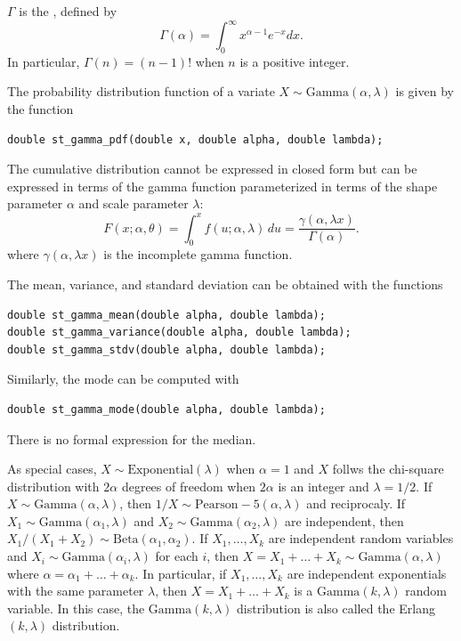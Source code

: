 $\Gamma$ is the , defined by
\[
\Gamma (\alpha) = \int_0^\infty x^{\alpha-1} e^{-x} dx.
\]
In particular, $\Gamma(n) = (n-1)!$ when $n$ is a positive integer.

The probability distribution function of a variate $X \sim
\mbox{Gamma}(\alpha, \lambda)$ is given by the function
\begin{verbatim}
double st_gamma_pdf(double x, double alpha, double lambda);
\end{verbatim}
The cumulative distribution cannot be expressed in closed form but can
be expressed in terms of the gamma function parameterized in terms of
the shape parameter $\alpha$ and scale parameter $\lambda$:
\[
F(x;\alpha,\theta) = \int_0^x f(u;\alpha,\lambda)\,du =\frac{\gamma(\alpha,
  \lambda x)}{\Gamma(\alpha)}. 
\]
where $\gamma(\alpha, \lambda x)$ is the incomplete gamma
function.

The mean, variance, and standard deviation can be obtained with the
functions
\begin{verbatim}
double st_gamma_mean(double alpha, double lambda);
double st_gamma_variance(double alpha, double lambda);
double st_gamma_stdv(double alpha, double lambda);
\end{verbatim}
Similarly, the mode can be computed with
\begin{verbatim}
double st_gamma_mode(double alpha, double lambda);
\end{verbatim}
There is no formal expression for the median.

As special cases, $X \sim
\mbox{Exponential}(\lambda)$ when $\alpha =
1$ and $X$ follws the chi-square distribution with $2\alpha$ degrees
of freedom when $2\alpha$ is an integer and $\lambda = 1/2$.
If $X \sim \mbox{Gamma}(\alpha, \lambda)$, then $1/X \sim
\mbox{Pearson}-5(\alpha, \lambda)$ and reciprocaly.
If $X_1 \sim \mbox{Gamma}(\alpha_1, \lambda)$ and $X_2 \sim
\mbox{Gamma}(\alpha_2, \lambda)$ are independent, then $X_1/(X_1 +
X_2) \sim \mbox{Beta}(\alpha_1, \alpha_2)$.
If $X_1,\ldots,X_k$ are independent random variables and $X_i \sim
\mbox{Gamma}(\alpha_i, \lambda)$ for each $i$, then $X = X_1 + \ldots + X_k
\sim \mbox{Gamma}(\alpha, \lambda)$ where $\alpha = \alpha_1 + \ldots +
\alpha_k$.
In particular, if $X_1,\ldots,X_k$ are independent exponentials with
the same parameter $\lambda$, then $X = X_1 + \ldots + X_k$ is a
$\mbox{Gamma}(k, \lambda)$ random variable.
In this case, the $\mbox{Gamma}(k, \lambda)$ distribution is also called the
Erlang$(k, \lambda)$ distribution.

